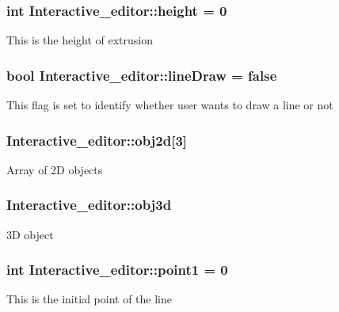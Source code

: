 \subsubsection[{\texorpdfstring{height}{height}}]{\setlength{\rightskip}{0pt plus 5cm}int Interactive\+\_\+editor\+::height = 0}\hypertarget{classInteractive__editor_aced5ec777fe62fb280f3668a1c59f9b7}{}\label{classInteractive__editor_aced5ec777fe62fb280f3668a1c59f9b7}
This is the height of extrusion 
\subsubsection[{\texorpdfstring{line\+Draw}{lineDraw}}]{\setlength{\rightskip}{0pt plus 5cm}bool Interactive\+\_\+editor\+::line\+Draw = false}\hypertarget{classInteractive__editor_aa0de8abac09ce2259252fba6c1958e83}{}\label{classInteractive__editor_aa0de8abac09ce2259252fba6c1958e83}
This flag is set to identify whether user wants to draw a line or not 
\subsubsection[{\texorpdfstring{obj2d}{obj2d}}]{ Interactive\+\_\+editor\+::obj2d\mbox{[}3\mbox{]}}\hypertarget{classInteractive__editor_a61dd4318434d640cc5191e038b66a407}{}\label{classInteractive__editor_a61dd4318434d640cc5191e038b66a407}
Array of 2D objects 
\subsubsection[{\texorpdfstring{obj3d}{obj3d}}]{ Interactive\+\_\+editor\+::obj3d}\hypertarget{classInteractive__editor_a2620ec3a4c9f18e9cd873e2a90c1167d}{}\label{classInteractive__editor_a2620ec3a4c9f18e9cd873e2a90c1167d}
3D object 
\subsubsection[{\texorpdfstring{point1}{point1}}]{\setlength{\rightskip}{0pt plus 5cm}int Interactive\+\_\+editor\+::point1 = 0}\hypertarget{classInteractive__editor_a07fe2897bcad8eabf5b98e01a162b2a1}{}\label{classInteractive__editor_a07fe2897bcad8eabf5b98e01a162b2a1}
This is the initial point of the line 
